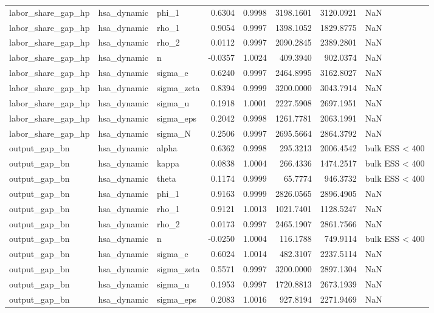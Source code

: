 \begin{tabular}{lllrrrrl}
labor\_share\_gap\_hp & hsa\_dynamic & phi\_1 & 0.6304 & 0.9998 & 3198.1601 & 3120.0921 & NaN \\
labor\_share\_gap\_hp & hsa\_dynamic & rho\_1 & 0.9054 & 0.9997 & 1398.1052 & 1829.8775 & NaN \\
labor\_share\_gap\_hp & hsa\_dynamic & rho\_2 & 0.0112 & 0.9997 & 2090.2845 & 2389.2801 & NaN \\
labor\_share\_gap\_hp & hsa\_dynamic & n & -0.0357 & 1.0024 & 409.3940 & 902.0374 & NaN \\
labor\_share\_gap\_hp & hsa\_dynamic & sigma\_e & 0.6240 & 0.9997 & 2464.8995 & 3162.8027 & NaN \\
labor\_share\_gap\_hp & hsa\_dynamic & sigma\_zeta & 0.8394 & 0.9999 & 3200.0000 & 3043.7914 & NaN \\
labor\_share\_gap\_hp & hsa\_dynamic & sigma\_u & 0.1918 & 1.0001 & 2227.5908 & 2697.1951 & NaN \\
labor\_share\_gap\_hp & hsa\_dynamic & sigma\_eps & 0.2042 & 0.9998 & 1261.7781 & 2063.1991 & NaN \\
labor\_share\_gap\_hp & hsa\_dynamic & sigma\_N & 0.2506 & 0.9997 & 2695.5664 & 2864.3792 & NaN \\
output\_gap\_bn & hsa\_dynamic & alpha & 0.6362 & 0.9998 & 295.3213 & 2006.4542 & bulk ESS < 400 \\
output\_gap\_bn & hsa\_dynamic & kappa & 0.0838 & 1.0004 & 266.4336 & 1474.2517 & bulk ESS < 400 \\
output\_gap\_bn & hsa\_dynamic & theta & 0.1174 & 0.9999 & 65.7774 & 946.3732 & bulk ESS < 400 \\
output\_gap\_bn & hsa\_dynamic & phi\_1 & 0.9163 & 0.9999 & 2826.0565 & 2896.4905 & NaN \\
output\_gap\_bn & hsa\_dynamic & rho\_1 & 0.9121 & 1.0013 & 1021.7401 & 1128.5247 & NaN \\
output\_gap\_bn & hsa\_dynamic & rho\_2 & 0.0173 & 0.9997 & 2465.1907 & 2861.7566 & NaN \\
output\_gap\_bn & hsa\_dynamic & n & -0.0250 & 1.0004 & 116.1788 & 749.9114 & bulk ESS < 400 \\
output\_gap\_bn & hsa\_dynamic & sigma\_e & 0.6024 & 1.0014 & 482.3107 & 2237.5114 & NaN \\
output\_gap\_bn & hsa\_dynamic & sigma\_zeta & 0.5571 & 0.9997 & 3200.0000 & 2897.1304 & NaN \\
output\_gap\_bn & hsa\_dynamic & sigma\_u & 0.1953 & 0.9997 & 1720.8813 & 2673.1939 & NaN \\
output\_gap\_bn & hsa\_dynamic & sigma\_eps & 0.2083 & 1.0016 & 927.8194 & 2271.9469 & NaN \\

\end{tabular}

